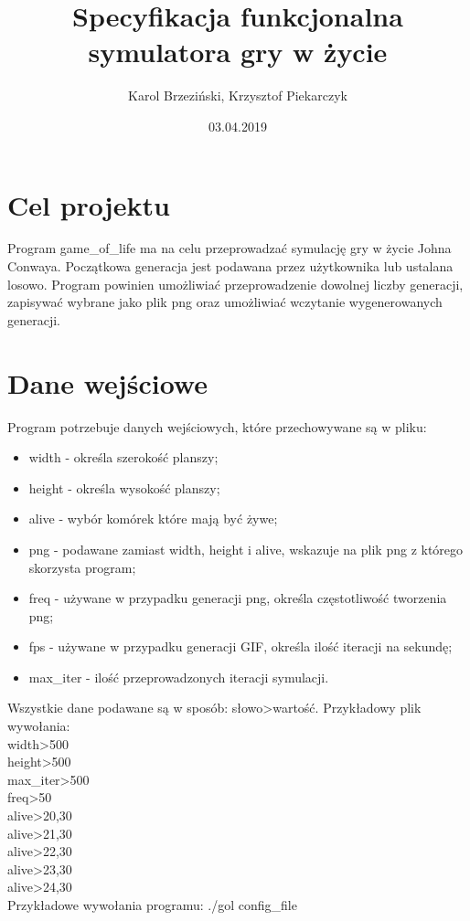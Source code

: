 \documentclass[12pt]{article}
\title{Specyfikacja funkcjonalna symulatora gry w życie}
\author{Karol Brzeziński, Krzysztof Piekarczyk}
\date{03.04.2019}
\begin{document}
\maketitle

\section{Cel projektu}
 Program game\_of\_life ma na celu przeprowadzać symulację gry w życie Johna Conwaya. Początkowa generacja jest podawana przez użytkownika lub ustalana losowo. Program powinien umożliwiać przeprowadzenie dowolnej liczby generacji, zapisywać wybrane jako plik png oraz umożliwiać wczytanie wygenerowanych generacji.
  
\section{Dane wejściowe}
Program potrzebuje danych wejściowych, które przechowywane są w pliku:
\begin{itemize}
\item width - określa szerokość planszy;

\item height - określa wysokość planszy;

\item alive - wybór komórek które mają być żywe;

\item png - podawane zamiast width, height i alive, wskazuje na plik png z którego skorzysta program;

\item freq - używane w przypadku generacji png, określa częstotliwość tworzenia png;

\item fps - używane w przypadku generacji GIF, określa ilość iteracji na sekundę;

\item max\_iter - ilość przeprowadzonych iteracji symulacji.

\end{itemize}
Wszystkie dane podawane są w sposób: słowo\textgreater{}wartość.
Przykładowy plik wywołania:\\
width\textgreater{}500\\
height\textgreater{}500\\
max\_iter\textgreater{}500\\
freq\textgreater{}50\\
alive\textgreater{}20,30\\
alive\textgreater{}21,30\\
alive\textgreater{}22,30\\
alive\textgreater{}23,30\\
alive\textgreater{}24,30\\
Przykładowe wywołania programu:	./gol config\_file
\end{document}
